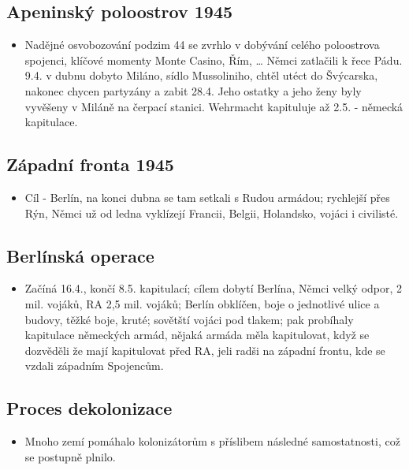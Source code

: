 \documentclass{article}
\begin{document}
\subsection*{Apeninský poloostrov 1945}
\begin{itemize}
    \item Nadějné osvobozování podzim 44 se zvrhlo v dobývání celého poloostrova spojenci, klíčové momenty Monte Casino, Řím, … Němci zatlačili k řece Pádu. 9.4. v dubnu dobyto Miláno, sídlo Mussoliniho, chtěl utéct do Švýcarska, nakonec chycen partyzány a zabit 28.4. Jeho ostatky a jeho ženy byly vyvěšeny v Miláně na čerpací stanici. Wehrmacht kapituluje až 2.5. - německá kapitulace.
\end{itemize}

\subsection*{Západní fronta 1945}
\begin{itemize}
    \item Cíl - Berlín, na konci dubna se tam setkali s Rudou armádou; rychlejší přes Rýn, Němci už od ledna vyklízejí Francii, Belgii, Holandsko, vojáci i civilisté.
\end{itemize}

\subsection*{Berlínská operace}
\begin{itemize}
    \item Začíná 16.4., končí 8.5. kapitulací; cílem dobytí Berlína, Němci velký odpor, 2 mil. vojáků, RA 2,5 mil. vojáků; Berlín obklíčen, boje o jednotlivé ulice a budovy, těžké boje, kruté; sovětští vojáci pod tlakem; pak probíhaly kapitulace německých armád, nějaká armáda měla kapitulovat, když se dozvěděli že mají kapitulovat před RA, jeli radši na západní frontu, kde se vzdali západním Spojencům.
\end{itemize}


\subsection*{Proces dekolonizace}
\begin{itemize}
    \item Mnoho zemí pomáhalo kolonizátorům s příslibem následné samostatnosti, což se postupně plnilo.
\end{itemize}
\end{document}
